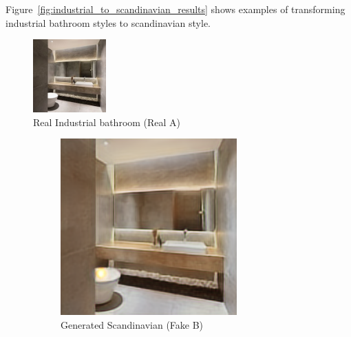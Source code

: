 \documentclass[twocolumn,superscriptaddress,aps]{revtex4-1}
\begin{document}
Figure~\ref{fig:industrial_to_scandinavian_results} shows examples of transforming industrial bathroom styles to scandinavian style.

\begin{figure}[h]
\centering
\includegraphics[width=0.25\textwidth]{assets/real_A.png}
\caption{Real Industrial bathroom (Real A)}
\label{fig:real_industrial}
\end{figure}

\begin{figure}[h]
\centering
\begin{subfigure}{0.2\textwidth}
    \includegraphics[width=\textwidth]{assets/fake_B.png}
    \caption{Generated Scandinavian (Fake B)}
    \label{fig:fake_scandinavian}
\end{subfigure}
\hfill
\begin{subfigure}{0.2\textwidth}

\end{subfigure}
\end{figure}
\end{document}
